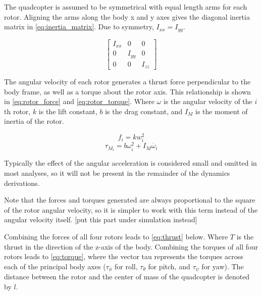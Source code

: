 \documentclass[letterpaper,12pt,titlepage,oneside,final]{book}
\begin{document}
The quadcopter is assumed to be symmetrical with equal length arms for each rotor. 
Aligning the arms along the body x and y axes gives the diagonal inertia matrix in \eqref{eq:inertia_matrix}. 
Due to symmetry, $I_{xx} = I_{yy}$.

\begin{equation} \label{eq:inertia_matrix}
\begin{bmatrix}
I_{xx} & 0 & 0 \\
0 & I_{yy} & 0 \\
0 & 0 & I_{zz}
\end{bmatrix}
\end{equation}

The angular velocity of each rotor generates a thrust force perpendicular to the body frame, as well as a torque about the rotor axis. 
This relationship is shown in \eqref{eq:rotor_force} and \eqref{eq:rotor_torque}. 
Where $\omega$ is the angular velocity of the $i$th rotor, $k$ is the lift constant, $b$ is the drag constant, and $I_{M}$ is the moment of inertia of the rotor.

\begin{equation} \label{eq:rotor_force}
f_{i} = kw_{i}^{2}
\end{equation}
\begin{equation} \label{eq:rotor_torque}
\tau_{M_{i}} = b\omega_{i}^{2} + I_{M}\dot{\omega_{i}}
\end{equation}

Typically the effect of the angular acceleration is considered small and omitted in most analyses, so it will not be present in the remainder of the dynamics derivations.

Note that the forces and torques generated are always proportional to the square of the rotor angular velocity, so it is simpler to work with this term instead of the angular velocity itself. [put this part under simulation instead]

Combining the forces of all four rotors leads to \eqref{eq:thrust} below. Where $T$ is the thrust in the direction of the z-axis of the body. 
Combining the torques of all four rotors leads to \eqref{eq:torque}, where the vector tau represents the torques across each of the principal body axes ($\tau_{\phi}$ for roll, $\tau_{\theta}$ for pitch, and $\tau_{\psi}$ for yaw). 
The distance between the rotor and the center of mass of the quadcopter is denoted by $l$. 
\end{document}
